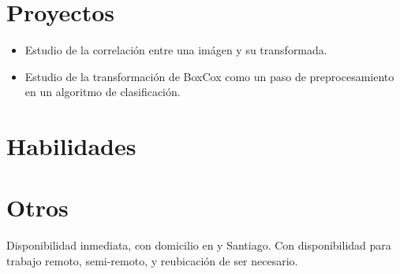\documentclass{my_cv}
\begin{document}
\section{Proyectos \faCogs}

\begin{itemize}
\item Estudio de la correlaci\'on entre una im\'agen y su transformada.
\item Estudio de la transformaci\'on de BoxCox como un paso de preprocesamiento en un algoritmo de clasificaci\'on.
\end{itemize}

\section{Habilidades \faBullseye}



\section{Otros \faPaperPlane}
Disponibilidad inmediata, con domicilio en {\valpo}  y Santiago. Con disponibilidad para trabajo remoto, semi-remoto, y reubicaci\'on de ser necesario. 

\end{document}
